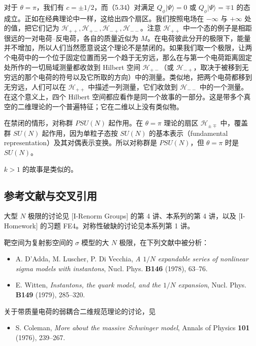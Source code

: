 对于 $\theta=\pi$，我们有 $c=\pm1/2$，而（5.34）对满足 $Q_\phi|\Psi\rangle=0$ 或 $Q_\phi|\Psi\rangle=\mp1$ 的态成立。正如在经典理论中一样，这给出四个扇区。我们按照电场在 $-\infty$ 与 $+\infty$ 处的值，把它们记为 $\mathcal{H}_{++},\mathcal{H}_{+-},\mathcal{H}_{-+},\mathcal{H}_{--}$。注意 $\mathcal{H}_{++}$ 中一个态的例子是相距很远的一对电荷–反电荷，各自的质量近似为 $M$。在电荷彼此分开的极限下，能量并不增加，所以人们当然愿意说这个理论不是禁闭的。如果我们取一个极限，让两个电荷中的一个位于固定位置而另一个趋于无穷远，那么在与第一个电荷距离固定处所作的一切局域测量都收敛到 Hilbert 空间 $\mathcal{H}_{+-}$（或 $\mathcal{H}_{-+}$，取决于被移到无穷远的那个电荷的符号以及它所取的方向）中的测量。类似地，把两个电荷都移到无穷远，人们可以在 $\mathcal{H}_{++}$ 中描述一列测量，它们收敛到 $\mathcal{H}_{--}$ 中的一个测量。在这个意义上，四个 Hilbert 空间都应看作是同一个故事的一部分。这是带多个真空的二维理论的一个普遍特征；它在二维以上没有类似物。

在禁闭的情形，对称群 $PSU(N)$ 起作用。在 $\theta=\pi$ 理论的扇区 $\mathcal{H}_{\pm\mp}$ 中，覆盖群 $SU(N)$ 起作用，因为单粒子态按 $SU(N)$ 的基本表示（fundamental representation）及其对偶表示变换。所以对称群是 $PSU(N)$，但 $\theta=\pi$ 时是 $SU(N)$。

$k>1$ 的故事是类似的。

\subsection{参考文献与交叉引用}

大型 $N$ 极限的讨论见 [I-Renorm Groups] 的第 4 讲、本系列的第 4 讲，以及 [I-Homework] 的习题 FE4。对称性破缺的讨论见本系列第 1 讲。

靶空间为复射影空间的 $\sigma$ 模型的大 $N$ 极限，在下列文献中被分析：

\begin{itemize}
\item A. D'Adda, M. Luscher, P. Di Vecchia, \emph{A $1/N$ expandable series of nonlinear sigma models with instantons}, Nucl. Phys. \textbf{B146} (1978), 63--76.
\item E. Witten, \emph{Instantons, the quark model, and the $1/N$ expansion}, Nucl. Phys. \textbf{B149} (1979), 285--320.
\end{itemize}

关于带质量电荷的弱耦合二维规范理论的讨论，见

\begin{itemize}
\item S. Coleman, \emph{More about the massive Schwinger model}, Annals of Physics \textbf{101} (1976), 239--267.
\end{itemize}


